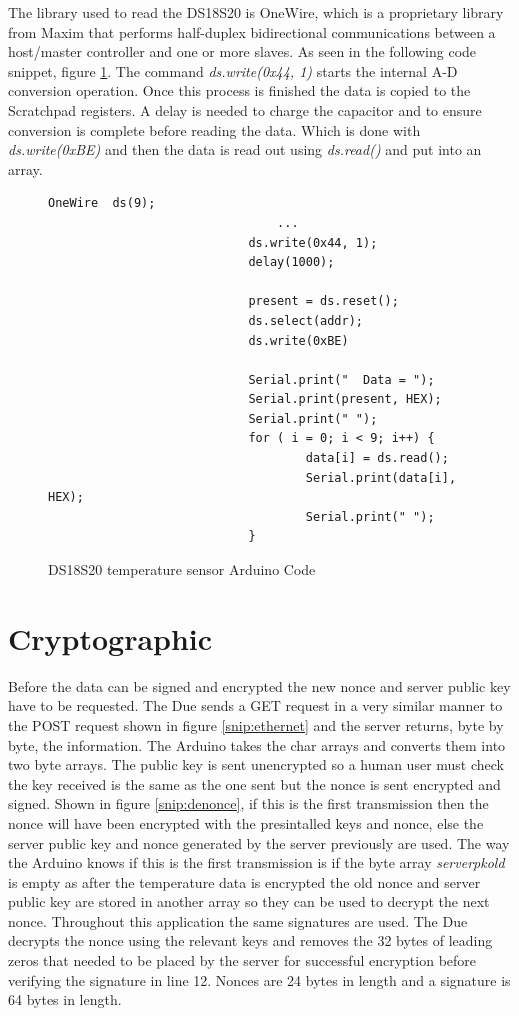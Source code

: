 The library used to read the DS18S20 is OneWire, which is a proprietary library from Maxim that performs half-duplex bidirectional communications between a host/master controller and one or more slaves. As seen in the following code snippet, figure \ref{snip:tempcode}. The command \emph{ds.write(0x44, 1)} starts the internal A-D conversion operation. Once this process is finished the data is copied to the Scratchpad registers. A delay is needed to charge the capacitor and to ensure conversion is complete before reading the data. Which is done with \emph{ds.write(0xBE)} and then the data is read out using \emph{ds.read()} and put into an array.

\begin{figure}[H]
\begin{lstlisting}[style=Arduino]
  							OneWire  ds(9);
								...
  							ds.write(0x44, 1); 
  						 	delay(1000);

  							present = ds.reset();
  							ds.select(addr);    
 							ds.write(0xBE)

  							Serial.print("  Data = "); 
  							Serial.print(present, HEX);
 						 	Serial.print(" ");
  							for ( i = 0; i < 9; i++) {          
    								data[i] = ds.read();
    								Serial.print(data[i], HEX);
    								Serial.print(" ");
  							}

\end{lstlisting}
\caption{DS18S20 temperature sensor Arduino Code}
\label{snip:tempcode}
\end{figure}


\section{Cryptographic}

Before the data can be signed and encrypted the new nonce and server public key have to be requested. The Due sends a GET request in a very similar manner to the POST request shown in figure \ref{snip:ethernet} and the server returns, byte by byte, the information. The Arduino takes the char arrays and converts them into two byte arrays. The public key is sent unencrypted so a human user must check the key received is the same as the one sent but the nonce is sent encrypted and signed. Shown in figure \ref{snip:denonce}, if this is the first transmission then the nonce will have been encrypted with the presintalled keys and nonce, else the server public key and nonce generated by the server previously are used. The way the Arduino knows if this is the first transmission is if the byte array \emph{serverpkold} is empty as after the temperature data is encrypted the old nonce and server public key are stored in another array so they can be used to decrypt the next nonce. Throughout this application the same signatures are used. The Due decrypts the nonce using the relevant keys and removes the 32 bytes of leading zeros that needed to be placed by the server for successful encryption before verifying the signature in line 12. Nonces are 24 bytes in length and a signature is 64 bytes in length.

